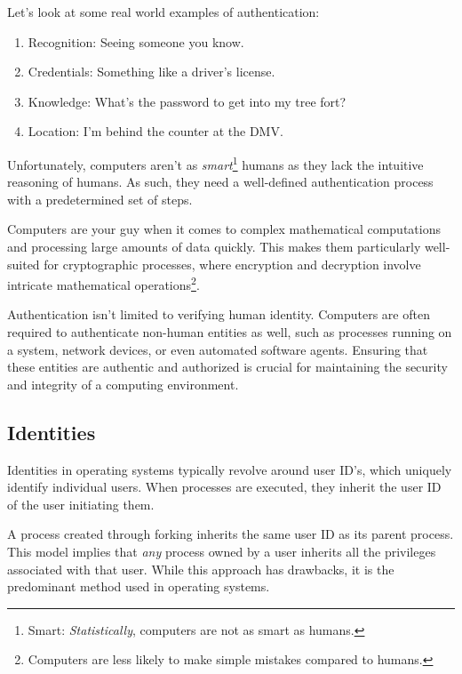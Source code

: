 \documentclass{report}
\newcommand{\exampleBegin}[1]{\begin{tcolorbox}[colback=blue!5!white,colframe=black!75!blue,title={Example:
      #1}]}
\newcommand{\exampleEnd}{\end{tcolorbox}}
\begin{document}
\exampleBegin{Real World Authentication}
Let's look at some real world examples of authentication:

\begin{enumerate}[label=\textit{(\roman*)}]
\item Recognition: Seeing someone you know.
\item Credentials: Something like a driver's license.
\item Knowledge: What's the password to get into my tree fort?
\item Location: I'm behind the counter at the DMV.
\end{enumerate}
\exampleEnd

Unfortunately, computers aren't as \textit{smart}\footnote{Smart: \textit{Statistically}, computers
are not as smart as humans.} humans as they lack the intuitive reasoning of humans. As such, they
need a well-defined authentication process with a predetermined set of steps.

Computers are your guy when it comes to complex mathematical computations and processing large
amounts of data quickly. This makes them particularly well-suited for cryptographic processes, where
encryption and decryption involve intricate mathematical operations\footnote{Computers are less
  likely to make simple mistakes compared to humans.}.

Authentication isn't limited to verifying human identity. Computers are often required to
authenticate non-human entities as well, such as processes running on a system, network devices, or
even automated software agents. Ensuring that these entities are authentic and authorized is crucial
for maintaining the security and integrity of a computing environment.


\subsection{Identities}
Identities in operating systems typically revolve around user ID's, which uniquely identify
individual users. When processes are executed, they inherit the user ID of the user initiating
them.

\exampleBegin{Forking ID's}
A process created through forking inherits the same user ID as its parent process. This model
implies that \textit{any} process owned by a user inherits all the privileges associated with that
user. While this approach has drawbacks, it is the predominant method used in operating systems.
\exampleEnd
\end{document}
